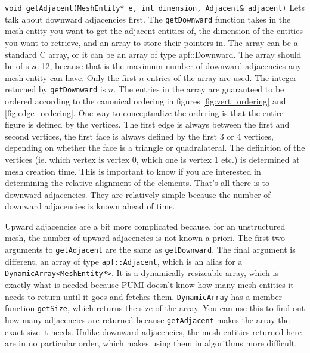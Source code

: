 \documentclass[12pt]{article}
\newcommand{\ttt}{\texttt}
\begin{document}
\noindent\ttt{void getAdjacent(MeshEntity* e, int dimension, Adjacent\& adjacent)}
\newline
\newline
Lets talk about downward adjacencies first.  The \ttt{getDownward} function takes in the mesh entity you want to get the adjacent entities of, the dimension of the entities you want to retrieve, and an array to store their pointers in.
The array can be a standard C array, or it can be an array of type apf::Downward.  The array should be of size 12, because that is the maximum number of downward adjacencies any mesh entity can have. Only the first $n$ entries of the array are used.  The integer returned by \ttt{getDownward} is $n$.
The entries in the array are guaranteed to be ordered according to the canonical ordering in figures \ref{fig:vert_ordering} and \ref{fig:edge_ordering}.  One way to conceptualize the ordering is that the entire figure is defined by the vertices.  The first edge is always between the first and second vertices, the first face is always defined by the first 3 or 4 vertices, depending on whether the face is a triangle or quadralateral.
The definition of the vertices (ie. which vertex is vertex 0, which one is vertex 1 etc.) is determined at mesh creation time.  This is important to know if you are interested in determining the relative alignment of the elements.
That's all there is to downward adjacencies.  They are relatively simple because the number of downward adjacencies is known ahead of time.

Upward adjacencies are a bit more complicated because, for an unstructured mesh, the number of upward adjacencies is not known a priori.  The first two arguments to \ttt{getAdjacent} are the same as \ttt{getDownward}.  
The final argument is different, an array of type \ttt{apf::Adjacent}, which is an alias for a \ttt{DynamicArray<MeshEntity*>}.  It is a dynamically resizeable array, which is exactly what is needed because PUMI doesn't know how many mesh entities it needs to return until it goes and fetches them.
\ttt{DynamicArray} has a member function \ttt{getSize}, which returns the size of the array.   You can use this to find out how many adjacencies are returned because \ttt{getAdjacent} makes the array the exact size it needs.
Unlike downward adjacencies, the mesh entities returned here are in no particular order, which makes using them in algorithms more difficult.
\end{document}
